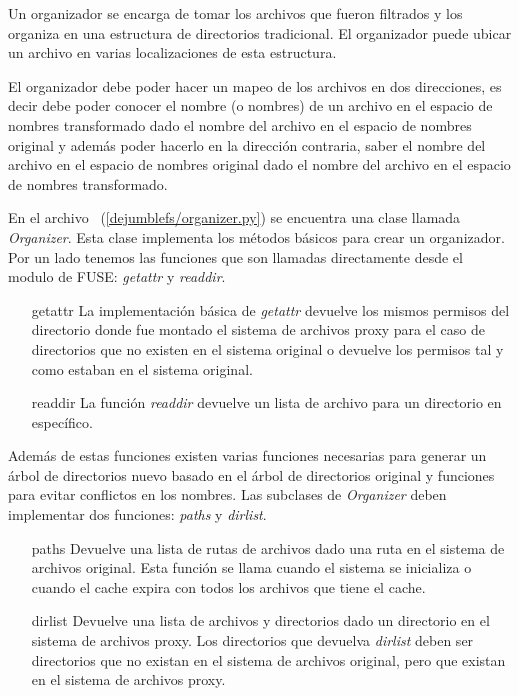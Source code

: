 Un organizador se encarga de tomar los archivos que fueron filtrados y los organiza en una estructura de directorios tradicional. El organizador puede ubicar un archivo en varias localizaciones de esta estructura.

El organizador debe poder hacer un mapeo de los archivos en dos direcciones, es decir debe poder conocer el nombre (o nombres) de un archivo en el espacio de nombres transformado dado el nombre del archivo en el espacio de nombres original y además poder hacerlo en la dirección contraria, saber el nombre del archivo en el espacio de nombres original dado el nombre del archivo en el espacio de nombres transformado.


En el archivo ~(\ref{dejumblefs/organizer.py}) se encuentra una clase llamada \textit{Organizer}. Esta clase implementa los métodos básicos para crear un organizador. Por un lado tenemos las funciones que son llamadas directamente desde el modulo de FUSE: \textit{getattr} y \textit{readdir}.

\begin{itemize}
\item[getattr] La implementación básica de \textit{getattr} devuelve los mismos permisos del directorio donde fue montado el sistema de archivos proxy para el caso de directorios que no existen en el sistema original o devuelve los permisos tal y como estaban en el sistema original.
\item[readdir] La función \textit{readdir} devuelve un lista de archivo para un directorio en específico.
\end{itemize}

Además de estas funciones existen varias funciones necesarias para generar un árbol de directorios nuevo basado en el árbol de directorios original y funciones para evitar conflictos en los nombres. Las subclases de \textit{Organizer} deben implementar dos funciones: \textit{paths} y \textit{dirlist}.

\begin{itemize}
\item[paths] Devuelve una lista de rutas de archivos dado una ruta en el sistema de archivos original. Esta función se llama cuando el sistema se inicializa o cuando el cache expira con todos los archivos que tiene el cache.
\item[dirlist] Devuelve una lista de archivos y directorios dado un directorio en el sistema de archivos proxy. Los directorios que devuelva \textit{dirlist} deben ser directorios que no existan en el sistema de archivos original, pero que existan en el sistema de archivos proxy.
\end{itemize}

